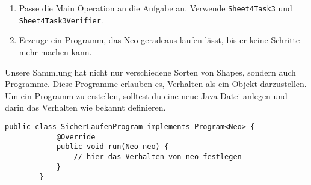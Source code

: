 
\begin{enumerate}
	\item Passe die Main Operation an die Aufgabe an.
		Verwende \lstinline{Sheet4Task3} und \lstinline{Sheet4Task3Verifier}.
	\item Erzeuge ein Programm, das Neo geradeaus laufen lässt, bis er keine Schritte mehr machen kann.
\end{enumerate}

\begin{Infobox}[Programme]
	Unsere Sammlung hat nicht nur verschiedene Sorten von Shapes, sondern auch Programme.
	Diese Programme erlauben es, Verhalten als ein Objekt darzustellen.
	Um ein Programm zu erstellen, solltest du eine neue Java-Datei anlegen und darin das Verhalten wie bekannt definieren.

	\begin{lstlisting}[title=SicherLaufenProgram.java]
		public class SicherLaufenProgram implements Program<Neo> {
			@Override
			public void run(Neo neo) {
				// hier das Verhalten von neo festlegen
			}
		}
	\end{lstlisting}

	
\end{Infobox}